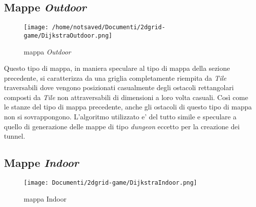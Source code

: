 \documentclass[11pt]{article}
\begin{document}
\subsection{Mappe \emph{Outdoor}}
\begin{figure}[htp]
\centering
\texttt{[image: /home/notsaved/Documenti/2dgrid-game/DijkstraOutdoor.png]}
\caption{mappa \emph{Outdoor}}
\label{img2}
\end{figure}
Questo tipo di mappa, in maniera speculare al tipo di mappa della sezione precedente, si caratterizza da una griglia completamente riempita da \emph{Tile} traversabili dove vengono posizionati casualmente degli ostacoli rettangolari composti da \emph{Tile} non attraversabili di dimensioni a loro volta casuali.
Cos\`i come le stanze del tipo di mappa precedente, anche gli ostacoli di questo tipo di mappa non si sovrappongono. L'algoritmo utilizzato e' del tutto simile e speculare a quello di generazione delle mappe di tipo \emph{dungeon} eccetto per la creazione dei tunnel.
\subsection{Mappe \emph{Indoor}}
\begin{figure}[H]
\centering
\texttt{[image: Documenti/2dgrid-game/DijkstraIndoor.png]}
\caption{mappa Indoor}
\label{img3}
\end{figure}
\end{document}
